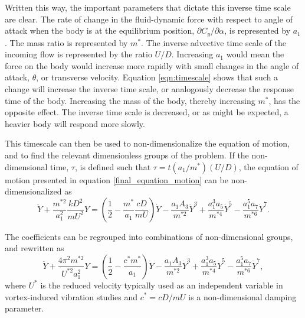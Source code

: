 Written this way, the important parameters that dictate this inverse time scale are clear. The rate of change in the fluid-dynamic force with respect to angle of attack when the body is at the equilibrium position, $\partial C_y/\partial \alpha$, is represented by $a_1$. The mass ratio is represented by $m^*$. The inverse advective time scale of the incoming flow is represented by the ratio $U/D$. Increasing $a_1$ would mean the force on the body would increase more rapidly with small changes in the angle of attack, $\theta$, or transverse velocity. Equation \ref{eqn:timescale} shows that such a change will increase the inverse time scale, or analogously decrease the response time of the body. Increasing the mass of the body, thereby increasing $m^*$, has the opposite effect. The inverse time scale is decreased, or as might be expected, a heavier body will respond more slowly.
 
This timescale can then be used to non-dimensionalize the equation of motion, and to find the relevant dimensionless groups of the problem. If the non-dimensional time, $\tau$, is defined such that $\tau=t(a_1/m^*)(U/D)$, the equation of motion presented in equation \ref{final_equation_motion} can be non-dimensionalized as
 \begin{equation}
   \label{eqn:eom_nondim}
   \ddot{Y} + \frac{m^{*2}}{a_1^2}\frac{kD^2}{mU^2}Y = \left(\frac{1}{2} - \frac{m^*}{a_1}\frac{cD}{mU}\right)\dot{Y} - \frac{a_1A_3}{m^{*2}}\dot{Y}^3 + \frac{a_1^3a_5}{m^{*4}}\dot{Y}^5 - \frac{a_1^5a_7}{m^{*6}}\dot{Y}^7.
 \end{equation}
 
The coefficients can be regrouped into combinations of non-dimensional groups, and rewritten as
 \begin{equation}
   \label{eqn:eom_nondim_regroup}
   \ddot{Y} + \frac{4\pi^{2}m^{*2}}{U^{*2}a_1^2}Y = \left(\frac{1}{2} - \frac{c^*m^*}{a_1}\right)\dot{Y} - \frac{a_1A_3}{m^{*2}}\dot{Y}^3 + \frac{a_1^3a_5}{m^{*4}}\dot{Y}^5 - \frac{a_1^5a_7}{m^{*6}}\dot{Y}^7,
 \end{equation}
where $U^{*}$ is the reduced velocity typically used as an independent variable in vortex-induced vibration studies and $c^*=cD/mU$ is a non-dimensional damping parameter.
 
